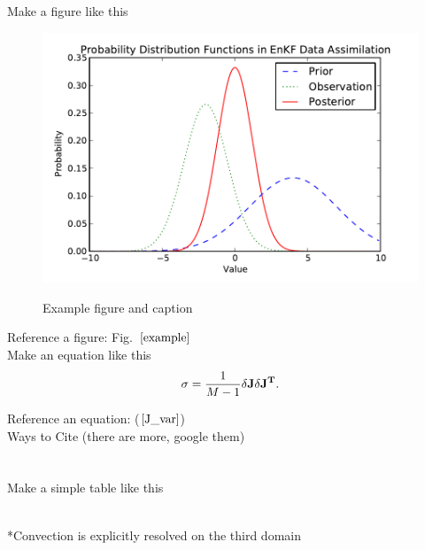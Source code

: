 \documentclass{ttuthes2015}
\newcommand{\tab}{\hspace*{2em}}  %
\begin{document}
\tab Make a figure like this
\begin{figure}[!htb]
  \centering
  \noindent\includegraphics[width=30pc,angle=0]{./example.pdf}\\
  \caption{Example figure and caption}
\label{example}
\end{figure}

\tab Reference a figure: Fig.~$\ref{example}$ \\

\tab Make an equation like this
\begin{align}\label{J_var}
	\sigma = \frac{1}{M-1} \delta\bf{J} \delta{\mathbf{J}}^T.
\end{align}

\tab Reference an equation: ($\ref{J_var}$) \\
\tab Ways to Cite (there are more, google them) \\
\citep{Ancell2013} \\
\cite{Ancell2013} \\

\tab Make a simple table like this
\begin{table}[!h]   %
\caption{Model Parameterizations Used} 
\centering %
 \\
*Convection is explicitly resolved on the third domain
\label{params} %
\end{table} 
\end{document}
